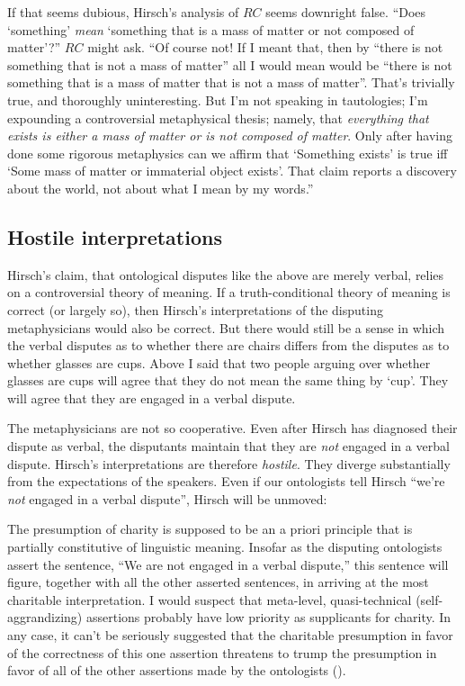 \documentclass[11pt]{article}
\newenvironment{squote}{%
\begin{spacing}{1}
       	\begin{list}{}{%
\setlength{\labelwidth}{0pt}%
\rightmargin\leftmargin%
}
\item\relax
}{%
\end{list}%
\end{spacing}
}
\begin{document}
\begin{spacing}{1.25}
If that seems dubious, Hirsch's analysis of $RC$ seems downright
false.  ``Does `something' {\em mean} `something that is a mass of
matter or not composed of matter'?''  $RC$ might ask.  ``Of course
not!  If I meant that, then by ``there is not something that is not a
mass of matter'' all I would mean would be ``there is not something
that is a mass of matter that is not a mass of matter''.  That's
trivially true, and thoroughly uninteresting.  But I'm not speaking in
tautologies; I'm expounding a controversial metaphysical thesis;
namely, that {\em everything that exists is either a mass of matter or
  is not composed of matter}.  Only after having done some rigorous
metaphysics can we affirm that `Something exists' is true iff `Some
mass of matter or immaterial object exists'.  That claim reports a
discovery about the world, not about what I mean by my words.''

\subsection{Hostile interpretations}
Hirsch's claim, that ontological disputes like the above are merely
verbal, relies on a controversial theory of meaning.  If a
truth-conditional theory of meaning is correct (or largely so), then
Hirsch's interpretations of the disputing metaphysicians would also be
correct.  But there would still be a sense in which the verbal
disputes as to whether there are chairs differs from the disputes as
to whether glasses are cups.  Above I said that two people arguing
over whether glasses are cups will agree that they do not mean the
same thing by `cup'.  They will agree that they are engaged in a
verbal dispute.

The metaphysicians are not so cooperative.  Even after Hirsch has
diagnosed their dispute as verbal, the disputants maintain that they
are {\em not} engaged in a verbal dispute.  Hirsch's interpretations
are therefore \emph{hostile}.  They diverge substantially from the
expectations of the speakers.  Even if our ontologists tell Hirsch
``we're \emph{not} engaged in a verbal dispute'', Hirsch will be
unmoved:

\begin{squote}
The presumption of charity is supposed to be an a priori principle
that is partially constitutive of linguistic meaning.  Insofar as the
disputing ontologists assert the sentence, ``We are not engaged in a
verbal dispute,'' this sentence will figure, together with all the
other asserted sentences, in arriving at the most charitable
interpretation.  I would suspect that meta-level, quasi-technical
(self-aggrandizing) assertions probably have low priority as
supplicants for charity.  In any case, it can't be seriously suggested
that the charitable presumption in favor of the correctness of this
one assertion threatens to trump the presumption in favor of all of
the other assertions made by the ontologists (\citeyear{hirsch2008}).
\end{squote}


\end{spacing}
\end{document}
